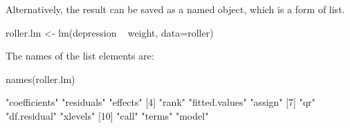 \documentclass{tufte-book}\usepackage[]{graphicx}\usepackage[]{color}
\begin{document}
Alternatively, the result can be saved as a named object,
which is a form of list.
\begin{Schunk}
\begin{Sinput}
roller.lm <- lm(depression ~ weight, data=roller)
\end{Sinput}
\end{Schunk}

The names of the list elements are:
\begin{Schunk}
\begin{Sinput}
names(roller.lm)
\end{Sinput}
\begin{Soutput}
 [1] "coefficients"  "residuals"     "effects"      
 [4] "rank"          "fitted.values" "assign"       
 [7] "qr"            "df.residual"   "xlevels"      
[10] "call"          "terms"         "model"        
\end{Soutput}
\end{Schunk}
\end{document}
